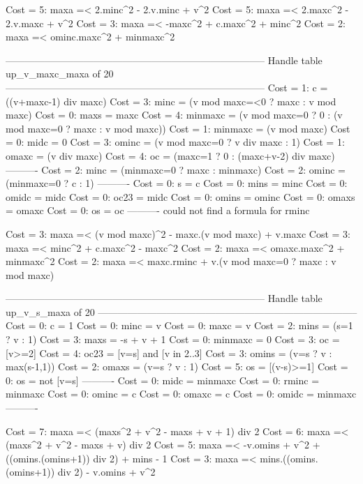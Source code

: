 Cost =  5:  maxa =< 2.minc^2 - 2.v.minc + v^2
Cost =  5:  maxa =< 2.maxc^2 - 2.v.maxc + v^2
Cost =  3:  maxa =< -maxc^2 + c.maxc^2 + minc^2
Cost =  2:  maxa =< ominc.maxc^2 + minmaxc^2

--------------------------------------------------------------------------------
Handle table up_v_maxc_maxa of 20
--------------------------------------------------------------------------------
Cost =  1:  c       = ((v+maxc-1) div maxc)
Cost =  3:  minc    = (v mod maxc=<0 ? maxc : v mod maxc)
Cost =  0:  maxs    = maxc
Cost =  4:  minmaxc = (v mod maxc=0 ? 0 : (v mod maxc=0 ? maxc : v mod maxc))
Cost =  1:  minmaxc = (v mod maxc)
Cost =  0:  midc    = 0
Cost =  3:  ominc   = (v mod maxc=0 ? v div maxc : 1)
Cost =  1:  omaxc   = (v div maxc)
Cost =  4:  oc      = (maxc=1 ? 0 : (maxc+v-2) div maxc)
----------
Cost =  2:  minc    = (minmaxc=0 ? maxc : minmaxc)
Cost =  2:  ominc   = (minmaxc=0 ? c : 1)
----------
Cost =  0:  s       = c
Cost =  0:  mins    = minc
Cost =  0:  omidc   = midc
Cost =  0:  oc23    = midc
Cost =  0:  omins   = ominc
Cost =  0:  omaxs   = omaxc
Cost =  0:  os      = oc
----------
could not find a formula for rminc

Cost =  3:  maxa =< (v mod maxc)^2 - maxc.(v mod maxc) + v.maxc
Cost =  3:  maxa =< minc^2 + c.maxc^2 - maxc^2
Cost =  2:  maxa =< omaxc.maxc^2 + minmaxc^2
Cost =  2:  maxa =< maxc.rminc + v.(v mod maxc=0 ? maxc : v mod maxc)

--------------------------------------------------------------------------------
Handle table up_v_s_maxa of 20
--------------------------------------------------------------------------------
Cost =  0:  c       = 1
Cost =  0:  minc    = v
Cost =  0:  maxc    = v
Cost =  2:  mins    = (s=1 ? v : 1)
Cost =  3:  maxs    = -s + v + 1
Cost =  0:  minmaxc = 0
Cost =  3:  oc      = [v>=2]
Cost =  4:  oc23    = [v=s] and [v in 2..3]
Cost =  3:  omins   = (v=s ? v : max(s-1,1))
Cost =  2:  omaxs   = (v=s ? v : 1)
Cost =  5:  os      = [(v-s)>=1]
Cost =  0:  os      = not [v=s]
----------
Cost =  0:  midc    = minmaxc
Cost =  0:  rminc   = minmaxc
Cost =  0:  ominc   = c
Cost =  0:  omaxc   = c
Cost =  0:  omidc   = minmaxc
----------

Cost =  7:  maxa =< (maxs^2 + v^2 - maxs + v + 1) div 2
Cost =  6:  maxa =< (maxs^2 + v^2 - maxs + v) div 2
Cost =  5:  maxa =< -v.omins + v^2 + ((omins.(omins+1)) div 2) + mins - 1
Cost =  3:  maxa =< mins.((omins.(omins+1)) div 2) - v.omins + v^2

